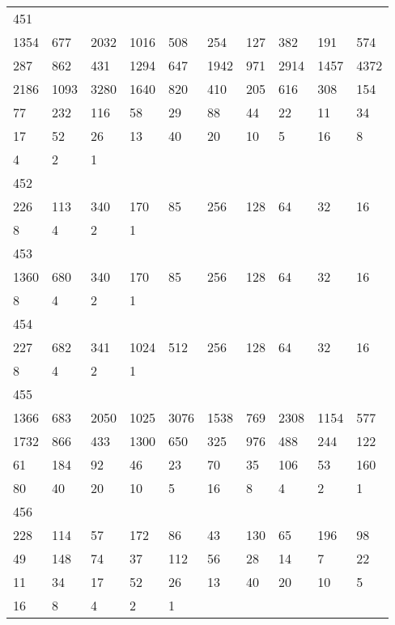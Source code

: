\begin{longtable}{*{10}{l}}
451&&&&&&&&&\\
1354& 677& 2032& 1016& 508& 254& 127& 382& 191& 574\\
287& 862& 431& 1294& 647& 1942& 971& 2914& 1457& 4372\\
2186& 1093& 3280& 1640& 820& 410& 205& 616& 308& 154\\
77& 232& 116& 58& 29& 88& 44& 22& 11& 34\\
17& 52& 26& 13& 40& 20& 10& 5& 16& 8\\
4& 2& 1& \\

452&&&&&&&&&\\
226& 113& 340& 170& 85& 256& 128& 64& 32& 16\\
8& 4& 2& 1& \\

453&&&&&&&&&\\
1360& 680& 340& 170& 85& 256& 128& 64& 32& 16\\
8& 4& 2& 1& \\

454&&&&&&&&&\\
227& 682& 341& 1024& 512& 256& 128& 64& 32& 16\\
8& 4& 2& 1& \\

455&&&&&&&&&\\
1366& 683& 2050& 1025& 3076& 1538& 769& 2308& 1154& 577\\
1732& 866& 433& 1300& 650& 325& 976& 488& 244& 122\\
61& 184& 92& 46& 23& 70& 35& 106& 53& 160\\
80& 40& 20& 10& 5& 16& 8& 4& 2& 1\\

456&&&&&&&&&\\
228& 114& 57& 172& 86& 43& 130& 65& 196& 98\\
49& 148& 74& 37& 112& 56& 28& 14& 7& 22\\
11& 34& 17& 52& 26& 13& 40& 20& 10& 5\\
16& 8& 4& 2& 1& \\


\end{longtable}
